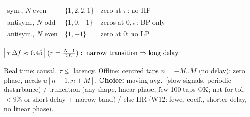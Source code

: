 \documentclass[a4paper,landscape]{article}
\newcommand{\bx}[1]{\fbox{$\textstyle #1$}}
\newcommand{\eqc}[1]{\par\vspace{0.2pt}\centerline{$#1$}\par\vspace{0.2pt}}
\begin{document}
\begin{multicols*}{4}
\begin{tabularx}{\linewidth}{@{}llY@{}}
sym., $N$ even & $\{1,2,2,1\}$ & zero at $\pi$: no HP\\
antisym., $N$ odd & $\{1,0,{-}1\}$ & zeros at $0,\pi$: BP only\\
antisym., $N$ even & $\{1,{-}1\}$ & zero at $0$: no LP
\end{tabularx}
\eqc{\bx{\tau\,\Delta f\approx0.45}\ (\tau=\tfrac{N-1}{2f_s}):\text{ narrow transition}\Rightarrow\text{long delay}}
Real time: causal, $\tau\le$ latency. Offline: centred taps $n=-M..M$ (no delay): zero phase, needs $u[n{+}1..n{+}M]$.
\textbf{Choice:} moving avg.\ (slow signals, periodic disturbance) / truncation (any shape, linear phase, few 100 taps OK; not for tol.\ ${<}9\%$ or short delay + narrow band) / else IIR (W12: fewer coeff., shorter delay, no linear phase).
\end{multicols*}
\end{document}
